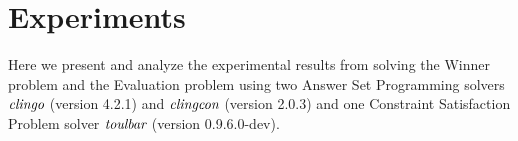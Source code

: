 
\section{Experiments}
Here we present and analyze the experimental results from solving the Winner problem
and the Evaluation problem using two Answer Set Programming solvers
$\textit{clingo}$ (version 4.2.1) and $\textit{clingcon}$ (version 2.0.3)
and one Constraint Satisfaction Problem solver $\textit{toulbar}$ (version 0.9.6.0-dev).

